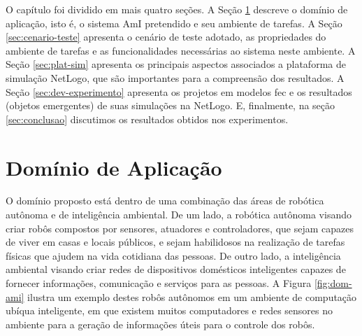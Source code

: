 O capítulo foi dividido em mais quatro seções. A Seção \ref{sec:dom-aplicacao} descreve o domínio de aplicação, isto é, o sistema AmI pretendido e seu ambiente de tarefas. A Seção \ref{sec:cenario-teste} apresenta o cenário de teste adotado, as propriedades do ambiente de tarefas e as funcionalidades necessárias ao sistema neste ambiente. A Seção \ref{sec:plat-sim} apresenta os principais aspectos associados a plataforma de simulação NetLogo, que são importantes para a compreensão dos resultados. A Seção \ref{sec:dev-experimento} apresenta os projetos em modelos \acrshort{fec} e os resultados (objetos emergentes) de suas simulações na NetLogo.  E, finalmente, na seção \ref{sec:conclusao} discutimos os resultados obtidos nos experimentos. 

\section{Domínio de Aplicação}
\label{sec:dom-aplicacao}

O domínio proposto está dentro de uma combinação das áreas de robótica autônoma e de inteligência ambiental. De um lado, a robótica autônoma visando criar robôs compostos por sensores, atuadores e controladores, que sejam capazes de viver em casas e locais públicos, e sejam habilidosos na realização de tarefas físicas que ajudem na vida cotidiana das pessoas. De outro lado, a inteligência ambiental visando criar redes de dispositivos domésticos inteligentes capazes de fornecer informações, comunicação e serviços para as pessoas. A Figura \ref{fig:dom-ami} ilustra um exemplo destes robôs autônomos em um ambiente de computação ubíqua inteligente, em que existem muitos computadores e redes sensores no ambiente para a geração de informações úteis para o controle dos robôs.

\begin{figure}[h!]
    \centering
\end{figure}

